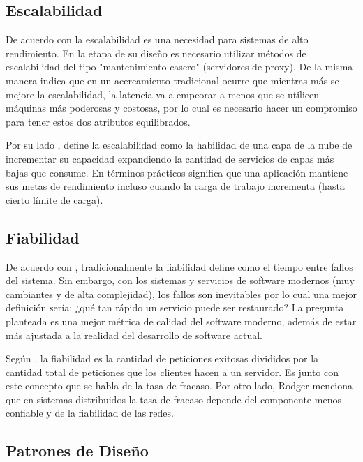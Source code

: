 \subsection{Escalabilidad}

De acuerdo con \cite{rodger2017tao} la escalabilidad es una necesidad para sistemas de alto rendimiento.
En la etapa de su diseño es necesario utilizar métodos de escalabilidad del tipo "mantenimiento casero"
(servidores de proxy).
De la misma manera indica que en un acercamiento tradicional ocurre que mientras más se mejore la 
escalabilidad, la latencia va a empeorar a menos que se utilicen máquinas más poderosas y costosas,
por lo cual es necesario hacer un compromiso para tener estos dos atributos equilibrados.

Por su lado \cite{lehrig2015scalability}, define la escalabilidad como la habilidad de una capa
de la nube de incrementar su capacidad expandiendo la cantidad de servicios de capas más bajas
que consume.
En términos prácticos significa que una aplicación mantiene sus metas de rendimiento incluso cuando
la carga de trabajo incrementa (hasta cierto límite de carga).


\subsection{Fiabilidad}

De acuerdo con \cite{humble2018accelerate}, tradicionalmente la fiabilidad define como el tiempo
entre fallos del sistema.
Sin embargo, con los sistemas y servicios de software modernos (muy cambiantes y de alta complejidad),
los fallos son inevitables por lo cual una mejor definición sería: ¿qué tan rápido un servicio puede
ser restaurado?
La pregunta planteada es una mejor métrica de calidad del software moderno, además de estar más ajustada
a la realidad del desarrollo de software actual.

Según \cite{rodger2017tao}, la fiabilidad es la cantidad de peticiones exitosas divididos
por la cantidad total de peticiones que los clientes hacen a un servidor.
Es junto con este concepto que se habla de la tasa de fracaso.
Por otro lado, Rodger menciona que en sistemas distribuidos la tasa de fracaso depende del
componente menos confiable y de la fiabilidad de las redes.


\subsection{Patrones de Diseño}

